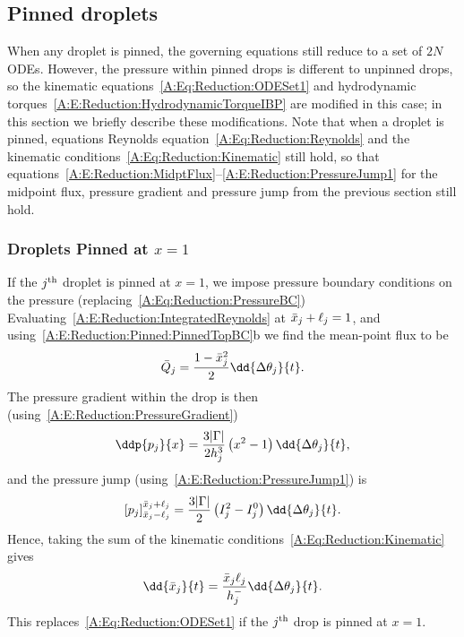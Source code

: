 \begin{subappendices}
\subsection{Pinned droplets}
When any droplet is pinned, the governing equations still reduce to a set of $2N$ ODEs. However, the pressure within pinned drops is different to unpinned drops, so the kinematic equations~\eqref{A:Eq:Reduction:ODESet1} and hydrodynamic torques~\eqref{A:E:Reduction:HydrodynamicTorqueIBP}  are modified in this case; in this section we briefly describe these modifications. Note that when a droplet is pinned, equations Reynolds equation~\eqref{A:Eq:Reduction:Reynolds} and the kinematic conditions~\eqref{A:Eq:Reduction:Kinematic} still hold, so that equations~\eqref{A:E:Reduction:MidptFlux}--\eqref{A:E:Reduction:PressureJump1} for the midpoint flux, pressure gradient and pressure jump from the previous section still hold.

\subsubsection{Droplets Pinned at $x = 1$}
If the $j^{\text{th}}$ droplet is pinned at $x = 1$, we impose pressure boundary conditions on the pressure (replacing~\eqref{A:Eq:Reduction:PressureBC})
Evaluating~\eqref{A:E:Reduction:IntegratedReynolds} at $\bar{x}_j + \ell_j=1$, and using~\eqref{A:E:Reduction:Pinned:PinnedTopBC}b we find the mean-point flux to be
\begin{equation}\label{A:E:Reduction:Pinned:Top:MidptFlux}
\bar{Q}_j = \frac{1 - \xbar_j^2}{2}\dd{\Delta \theta_{j}}{t}.
\end{equation}
The pressure gradient within the drop is then (using~\eqref{A:E:Reduction:PressureGradient})
\begin{equation}\label{A:E:Reduction:Pinned:Top:PressureGradient}
\ddp{p_j}{x} = \frac{3|\Gamma|}{2h_j^3}\left(x^2 - 1\right)\dd{\Delta \theta_{j}}{t},
\end{equation}
and the pressure jump (using~\eqref{A:E:Reduction:PressureJump1}) is
\begin{equation}\label{A:E:Reduction:Pinned:Top:PressureJump}
\left[p_j\right]^{\xbar_j + \ell_j}
_{\xbar_j - \ell_j} = \frac{3|\Gamma|}{2}\left(I_j^2 - I_j^0\right)\dd{\Delta \theta_{j}}{t}.
\end{equation}
Hence, taking the sum of the kinematic conditions~\eqref{A:Eq:Reduction:Kinematic} gives
\begin{equation}\label{A:E:Reduction:Pinned:Top:KinematicEquations}
\dd{\xbar_j}{t} = \frac{\xbar_j\ell_j}{h_j^-}\dd{\Delta \theta_{j}}{t}.
\end{equation}
This replaces~\eqref{A:Eq:Reduction:ODESet1} if the $j^{\text{th}}$ drop is pinned at $x = 1$.


\end{subappendices}
